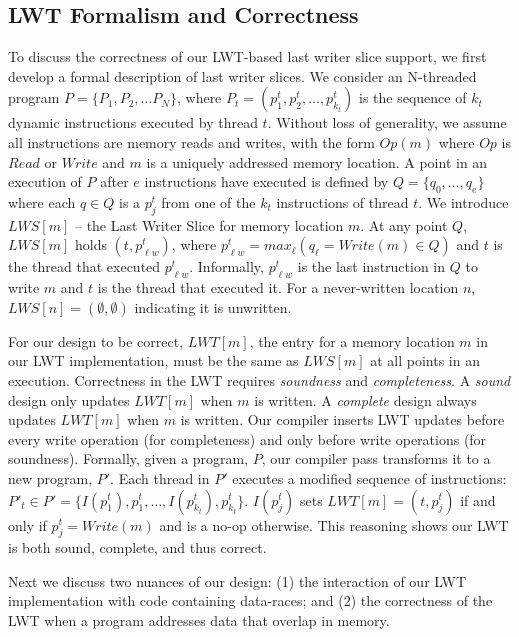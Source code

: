 \documentclass[preprint,9pt]{sigplanconf}
\newcommand{\lwt}{LWT\xspace}
\begin{document}
\subsection{\lwt Formalism and Correctness}
\label{sec:lwssoundness}
To discuss the correctness of our \lwt-based last writer slice support, we
first develop a formal description of last writer slices.  We consider an
N-threaded program $P = \{P_1, P_2, \ldots P_N\}$, where $P_t = (p^{t}_{1},
p^{t}_{2}, \ldots, p^{t}_{k_{t}})$ is the sequence of $k_{t}$ dynamic
instructions executed by thread $t$.  Without loss of generality, we assume all
instructions are memory reads and writes, with the form $Op(m)$ where $Op$ is
$Read$ or $Write$ and $m$ is a uniquely addressed memory location.
A point in an execution of $P$ after $e$ instructions have
executed is defined by $Q = \{q_{0}, \ldots, q_{e}\}$ where each $q \in Q$ is a
$p^{t}_{j}$ from one of the $k_t$ instructions of thread $t$.  We introduce
$LWS[m]$ -- the Last Writer Slice for memory location $m$.   At any point $Q$,
$LWS[m]$ holds $(t,p^{t}_{\ell w})$, where $p^{t}_{\ell w} = max_{\ell}( 
q_{\ell} = Write(m) \in Q)$ and $t$ is the thread that
executed $p^{t}_{\ell w}$. Informally, $p^{t}_{\ell w}$ is the last instruction
in $Q$ to write $m$ and $t$ is the thread that executed it.  For a
never-written location $n$, $LWS[n] = (\emptyset,\emptyset)$ indicating it is
unwritten.

For our design to be correct, $LWT[m]$, the entry for a memory location $m$ in
our \lwt implementation, must be the same as $LWS[m]$ at all points in an
execution.  Correctness in the \lwt requires {\em soundness} and {\em
completeness}.  A {\em sound} design only updates $LWT[m]$ when $m$ is written.
A {\em complete} design always updates $LWT[m]$ when $m$ is written.  Our
compiler inserts \lwt updates before every write operation (for completeness)
and only before write operations (for soundness).  Formally, given a program,
$P$, our compiler pass transforms it to a new program, $P'$.  Each thread in
$P'$ executes a modified sequence of instructions: $P'_{t} \in P' = \{
I(p^{t}_{1}), p^{t}_{1}, \ldots, I(p^{t}_{k_{t}}), p^{t}_{k_{t}} \}$.
$I(p^{t}_{j})$ sets $LWT[m] = (t,p^{t}_{j})$ if and only if $p^{t}_{j} =
Write(m)$ and is a no-op otherwise.  This reasoning shows our \lwt is both
sound, complete, and thus correct.

Next we discuss two nuances of our design: (1) the interaction of our \lwt
implementation with code containing data-races; and (2) the correctness of the
\lwt when a program addresses data that overlap in memory. 
\end{document}
